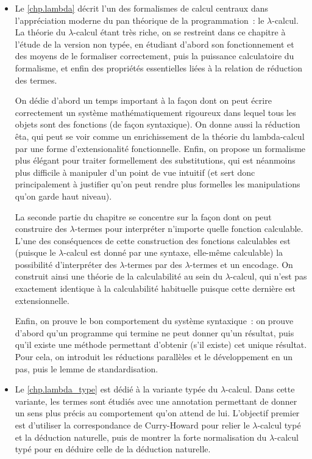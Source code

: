 \begin{itemize}
  On introduit finalement la notion de coupure adaptée à la déduction naturelle,
  mais on reporte au \cref{chp.lambda_type} la preuve que l'élimination des
  coupures termine bien.

\item Le \cref{chp.lambda} décrit l'un des formalismes de calcul centraux dans
  l'appréciation moderne du pan théorique de la programmation~: le
  $\lambda$-calcul.
  La théorie du $\lambda$-calcul étant très riche, on se restreint dans ce
  chapitre à l'étude de la version non typée, en étudiant d'abord son
  fonctionnement et des moyens de le formaliser correctement, puis la puissance
  calculatoire du formalisme, et enfin des propriétés essentielles liées à la
  relation de réduction des termes.

  On dédie d'abord un temps important à la façon dont on peut écrire
  correctement un système mathématiquement rigoureux dans lequel tous les objets
  sont des fonctions (de façon syntaxique). On donne aussi la réduction êta, qui
  peut se voir comme un enrichissement de la théorie du lambda-calcul par une
  forme d'extensionalité fonctionnelle. Enfin, on propose un formalisme plus
  élégant pour traiter formellement des substitutions, qui est néanmoins plus
  difficile à manipuler d'un point de vue intuitif (et sert donc principalement
  à justifier qu'on peut rendre plus formelles les manipulations qu'on garde
  haut niveau).

  La seconde partie du chapitre se concentre sur la façon dont on peut
  construire des $\lambda$-termes pour interpréter n'importe quelle fonction
  calculable. L'une des conséquences de cette construction des fonctions
  calculables est (puisque le $\lambda$-calcul est donné par une syntaxe,
  elle-même calculable) la possibilité
  d'interpréter des $\lambda$-termes par des $\lambda$-termes et un encodage. On
  construit ainsi une théorie de la calculabilité au sein du $\lambda$-calcul,
  qui n'est pas exactement identique à la calculabilité habituelle puisque cette
  dernière est extensionnelle.

  Enfin, on prouve le bon comportement du système syntaxique~: on prouve d'abord
  qu'un programme qui termine ne peut donner qu'un résultat, puis qu'il existe
  une méthode permettant d'obtenir (s'il existe) cet unique résultat. Pour cela,
  on introduit les réductions parallèles et le développement en un pas, puis le
  lemme de standardisation.

\item Le \cref{chp.lambda_type} est dédié à la variante typée du
  $\lambda$-calcul. Dans cette variante, les termes sont étudiés avec une
  annotation permettant de donner un sens plus précis au comportement qu'on
  attend de lui. L'objectif premier est d'utiliser la correspondance de
  Curry-Howard pour relier le $\lambda$-calcul typé et la
  déduction naturelle, puis de montrer la forte normalisation du
  $\lambda$-calcul typé pour en déduire celle de la déduction naturelle.


\end{itemize}

